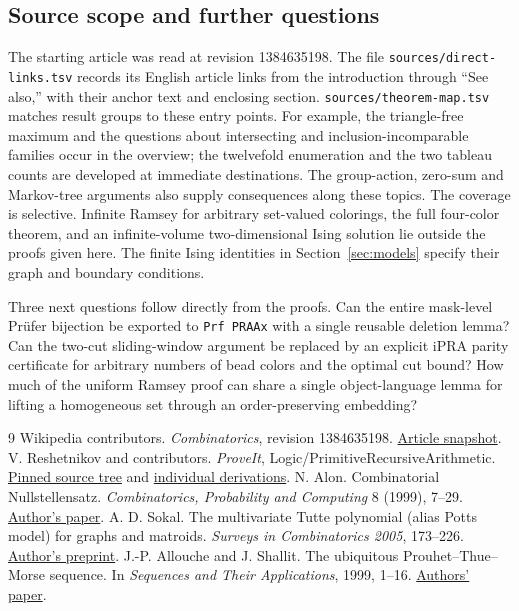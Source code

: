 \subsection{Source scope and further questions}
The starting article was read at revision 1384635198. The file \texttt{sources/direct-links.tsv} records its English article links from the introduction through ``See also,'' with their anchor text and enclosing section. \texttt{sources/theorem-map.tsv} matches result groups to these entry points. For example, the triangle-free maximum and the questions about intersecting and inclusion-incomparable families occur in the overview; the twelvefold enumeration and the two tableau counts are developed at immediate destinations. The group-action, zero-sum and Markov-tree arguments also supply consequences along these topics. The coverage is selective. Infinite Ramsey for arbitrary set-valued colorings, the full four-color theorem, and an infinite-volume two-dimensional Ising solution lie outside the proofs given here. The finite Ising identities in Section~\ref{sec:models} specify their graph and boundary conditions.

Three next questions follow directly from the proofs. Can the entire mask-level Pr\"ufer bijection be exported to \texttt{Prf PRAAx} with a single reusable deletion lemma? Can the two-cut sliding-window argument be replaced by an explicit iPRA parity certificate for arbitrary numbers of bead colors and the optimal cut bound? How much of the uniform Ramsey proof can share a single object-language lemma for lifting a homogeneous set through an order-preserving embedding?

\begin{thebibliography}{9}\small
{} Wikipedia contributors. \emph{Combinatorics}, revision 1384635198. \href{https://en.wikipedia.org/w/index.php?title=Combinatorics\&oldid=1384635198}{Article snapshot}.
 V. Reshetnikov and contributors. \emph{ProveIt}, Logic/PrimitiveRecursiveArithmetic. \href{https://github.com/VladimirReshetnikov/ProveIt/tree/b4de6f7a61a3fcf9740373b93089830f79e342f6/Logic/PrimitiveRecursiveArithmetic}{Pinned source tree} and \href{https://github.com/VladimirReshetnikov/ProveIt/tree/b4de6f7a61a3fcf9740373b93089830f79e342f6/Logic/PrimitiveRecursiveArithmetic/Derivations/Lean/IPRADerivations/Combinatorics}{individual derivations}.
 N. Alon. Combinatorial Nullstellensatz. \emph{Combinatorics, Probability and Computing} 8 (1999), 7--29. \href{https://www.math.tau.ac.il/~nogaa/PDFS/null2.pdf}{Author's paper}.
 A. D. Sokal. The multivariate Tutte polynomial (alias Potts model) for graphs and matroids. \emph{Surveys in Combinatorics 2005}, 173--226. \href{https://arxiv.org/abs/math/0503607}{Author's preprint}.
 J.-P. Allouche and J. Shallit. The ubiquitous Prouhet--Thue--Morse sequence. In \emph{Sequences and Their Applications}, 1999, 1--16. \href{https://cs.uwaterloo.ca/~shallit/Papers/ubiq15.pdf}{Authors' paper}.
\end{thebibliography}
